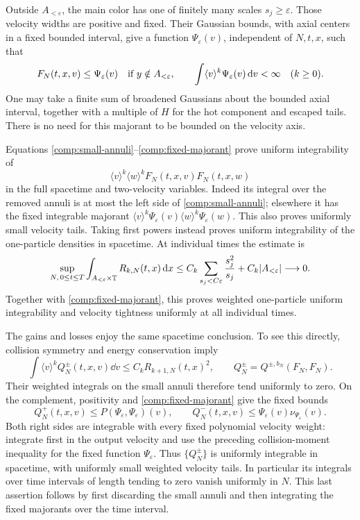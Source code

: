 Outside \(A_{<\varepsilon}\), the main color has one of finitely many
scales \(s_j\geq\varepsilon\). Those
velocity widths are positive and fixed. Their Gaussian bounds, with
axial centers in a fixed bounded interval, give a function
\(\Psi_\varepsilon(v)\), independent of \(N,t,x\), such that
\begin{equation}\label{comp:fixed-majorant}
F_N(t,x,v)\leq\Psi_\varepsilon(v)
\quad\hbox{if }y\notin A_{<\varepsilon},\qquad
\int\langle v\rangle^k\Psi_\varepsilon(v)\,\mathrm d v<\infty
\quad(k\geq0).
\end{equation}
One may take a finite sum of broadened Gaussians about the bounded axial
interval, together with a multiple of \(H\) for the hot component and
escaped tails. There is no need for this majorant to be bounded on the
velocity axis.

Equations \eqref{comp:small-annuli}--\eqref{comp:fixed-majorant} prove
uniform integrability of
\[
\langle v\rangle^k\langle w\rangle^k
 F_N(t,x,v)F_N(t,x,w)
\]
in the full spacetime and two-velocity variables. Indeed its integral
over the removed annuli is at most the left side of
\eqref{comp:small-annuli}; elsewhere it has the fixed integrable
majorant
\(\langle v\rangle^k\Psi_\varepsilon(v)
  \langle w\rangle^k\Psi_\varepsilon(w)\).
This also proves uniformly small velocity tails. Taking first powers
instead proves uniform integrability of the one-particle densities in
spacetime. At individual times the estimate is
\begin{equation}\label{comp:fixed-time-small}
\sup_{N,\,0\leq t\leq T}
 \int_{A_{<\varepsilon}\times\mathbb T}R_{k,N}(t,x)\,\mathrm d x
\leq C_k\sum_{s_j<C\varepsilon}\frac{s_j^2}{s_j}
       +C_k|A_{<\varepsilon}|\longrightarrow0.
\end{equation}
Together with \eqref{comp:fixed-majorant}, this proves weighted
one-particle uniform integrability and velocity tightness uniformly at
all individual times.

The gains and losses enjoy the same spacetime conclusion. To see this
directly, collision symmetry and energy conservation imply
\[
\int\langle v\rangle^k
 Q_N^\pm(t,x,v)\dd v\leq C_k R_{k+1,N}(t,x)^2,
\qquad Q_N^\pm=Q^{\pm,b_N}(F_N,F_N).
\]
Their weighted integrals on the small annuli therefore tend uniformly
to zero. On the complement, positivity and \eqref{comp:fixed-majorant}
give the fixed bounds
\[
Q_N^+(t,x,v)\leq P(\Psi_\varepsilon,\Psi_\varepsilon)(v),\qquad
Q_N^-(t,x,v)\leq\Psi_\varepsilon(v)\nu_{\Psi_\varepsilon}(v).
\]
Both right sides are integrable with every fixed polynomial velocity
weight: integrate first in the output velocity and use the preceding
collision-moment inequality for the fixed function
\(\Psi_\varepsilon\). Thus \(\{Q_N^\pm\}\) is uniformly integrable
in spacetime, with uniformly small weighted velocity tails. In
particular its integrals over time intervals of length tending to zero
vanish uniformly in \(N\). This last assertion follows by first
discarding the small annuli and then integrating the fixed majorants
over the time interval.


